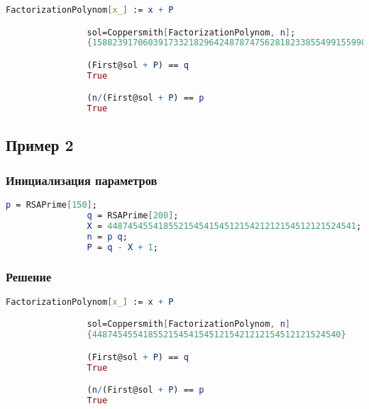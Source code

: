 	    		\begin{lstlisting}[language=Mathematica,caption={
		      		Решение
		    	}]
				FactorizationPolynom[x_] := x + P

				sol=Coppersmith[FactorizationPolynom, n];
				{158823917060391733218296424878747562818233855499155998}

				(First@sol + P) == q
				True

				(n/(First@sol + P) == p
				True
		    	\end{lstlisting}

    	\subsection{Пример 2}

	  		\subsubsection{Инициализация параметров}

	  			\begin{lstlisting}[language=Mathematica,caption={
		      		Инициализация параметров
		    	}]
				p = RSAPrime[150];
				q = RSAPrime[200];
				X = 4487454554185521545415451215421212154512121524541;
				n = p q;
				P = q - X + 1;
		    	\end{lstlisting}

	    	\subsubsection{Решение}

	    		\begin{lstlisting}[language=Mathematica,caption={
		      		Решение
		    	}]
				FactorizationPolynom[x_] := x + P

				sol=Coppersmith[FactorizationPolynom, n]
				{4487454554185521545415451215421212154512121524540}

				(First@sol + P) == q
				True

				(n/(First@sol + P) == p
				True
		    	\end{lstlisting}

